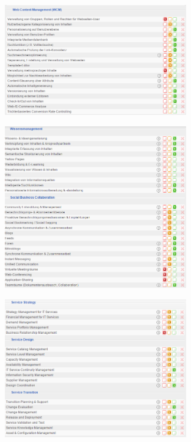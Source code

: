 \documentclass[12pt]{article}
\begin{document}
\noindent
\begin{figure}[!h]
\centering
\includegraphics[width=0.7\textwidth]{images/tr36}
\end{figure}\FloatBarrier
\noindent
\begin{figure}[!h]
\centering
\includegraphics[width=0.7\textwidth]{images/tr37}
\end{figure}\FloatBarrier
\noindent
\begin{figure}[!h]
\centering
\includegraphics[width=0.7\textwidth]{images/tr38}
\end{figure}\FloatBarrier
\end{document}
